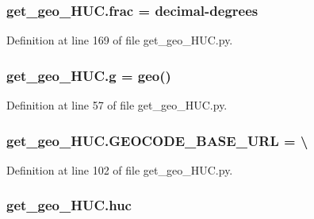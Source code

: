 \subsubsection[{\texorpdfstring{frac}{frac}}]{\setlength{\rightskip}{0pt plus 5cm}get\+\_\+geo\+\_\+\+H\+U\+C.\+frac = decimal-\/{\bf degrees}}\hypertarget{namespaceget__geo___h_u_c_a14d62b5f7d112b3f57e1e8dca6ef5dee}{}\label{namespaceget__geo___h_u_c_a14d62b5f7d112b3f57e1e8dca6ef5dee}


Definition at line 169 of file get\+\_\+geo\+\_\+\+H\+U\+C.\+py.

\subsubsection[{\texorpdfstring{g}{g}}]{\setlength{\rightskip}{0pt plus 5cm}get\+\_\+geo\+\_\+\+H\+U\+C.\+g = {\bf geo}()}\hypertarget{namespaceget__geo___h_u_c_a1619e8221c4336ab1e3f9c06c3481806}{}\label{namespaceget__geo___h_u_c_a1619e8221c4336ab1e3f9c06c3481806}


Definition at line 57 of file get\+\_\+geo\+\_\+\+H\+U\+C.\+py.

\subsubsection[{\texorpdfstring{G\+E\+O\+C\+O\+D\+E\+\_\+\+B\+A\+S\+E\+\_\+\+U\+RL}{GEOCODE_BASE_URL}}]{\setlength{\rightskip}{0pt plus 5cm}get\+\_\+geo\+\_\+\+H\+U\+C.\+G\+E\+O\+C\+O\+D\+E\+\_\+\+B\+A\+S\+E\+\_\+\+U\+RL = \textbackslash{}}\hypertarget{namespaceget__geo___h_u_c_a7aa1af4577a3ac49f7c1b8ff5e1c88e8}{}\label{namespaceget__geo___h_u_c_a7aa1af4577a3ac49f7c1b8ff5e1c88e8}


Definition at line 102 of file get\+\_\+geo\+\_\+\+H\+U\+C.\+py.

\subsubsection[{\texorpdfstring{huc}{huc}}]{\setlength{\rightskip}{0pt plus 5cm}get\+\_\+geo\+\_\+\+H\+U\+C.\+huc}\hypertarget{namespaceget__geo___h_u_c_ab14c44a4718f2c2eb40b85e71e76a77a}{}\label{namespaceget__geo___h_u_c_ab14c44a4718f2c2eb40b85e71e76a77a}


